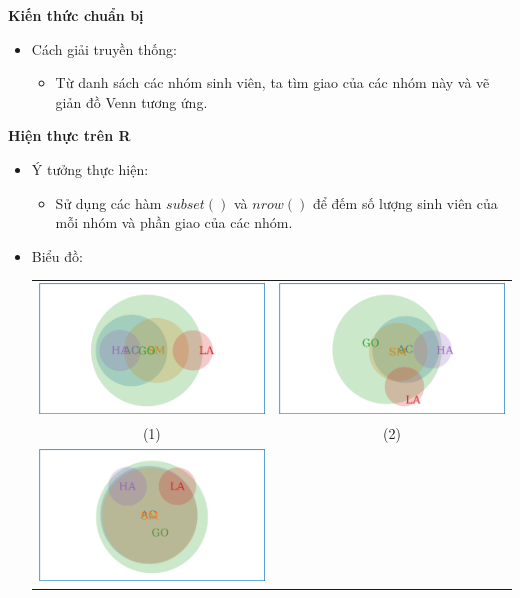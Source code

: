 \documentclass[a4paper]{article}
\theoremstyle{definition}
\begin{document}
    \bf Kiến thức chuẩn bị\normalfont
    \begin{itemize}
        \item Cách giải truyền thống:
        \begin{itemize}
            \item Từ danh sách các nhóm sinh viên, ta tìm giao của các nhóm này và vẽ giản đồ Venn tương ứng.
        \end{itemize}
    \end{itemize}
    \bf Hiện thực trên R\normalfont
    \begin{itemize}
        \item Ý tưởng thực hiện:
        \begin{itemize}
            \item Sử dụng các hàm $subset()$ và $nrow()$ để đếm số lượng sinh viên của mỗi nhóm và phần giao của các nhóm.
        \end{itemize}
        \item Biểu đồ:\\
        \begin{center}
            \begin{tabular}{c c}
                 \includegraphics[width = 6.9cm]{Images/img11-1-1.png} & \includegraphics[width = 6.9cm]{Images/img11-1-2.png} \\
                 (1) & (2) \\
                 \includegraphics[width = 6.9cm]{Images/img11-1-3.png} &

\end{tabular}
\end{center}
\end{itemize}
\end{document}
